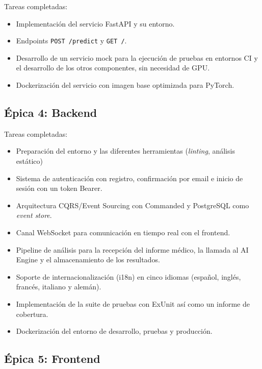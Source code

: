 Tareas completadas:
\begin{itemize}[noitemsep]
 \item Implementación del servicio FastAPI y su entorno.
 \item Endpoints \texttt{POST /predict} y \texttt{GET /}.
 \item Desarrollo de un servicio mock para la ejecución de pruebas en entornos CI y el desarrollo de los otros componentes, sin necesidad de GPU.
 \item Dockerización del servicio con imagen base optimizada para PyTorch.
\end{itemize}

\subsection{Épica 4: Backend}

Tareas completadas:
\begin{itemize}[noitemsep]
 \item Preparación del entorno y las diferentes herramientas (\emph{linting}, análisis estático)
 \item Sistema de autenticación con registro, confirmación por email e inicio de sesión con un token Bearer.
 \item Arquitectura CQRS/Event Sourcing con Commanded y PostgreSQL como \emph{event store}.
 \item Canal WebSocket para comunicación en tiempo real con el frontend.
 \item Pipeline de análisis para la recepción del informe médico, la llamada al AI Engine y el almacenamiento de los resultados.
 \item Soporte de internacionalización (i18n) en cinco idiomas (español, inglés, francés, italiano y alemán).
 \item Implementación de la suite de pruebas con ExUnit así como un informe de cobertura.
 \item Dockerización del entorno de desarrollo, pruebas y producción.
\end{itemize}

\subsection{Épica 5: Frontend}

